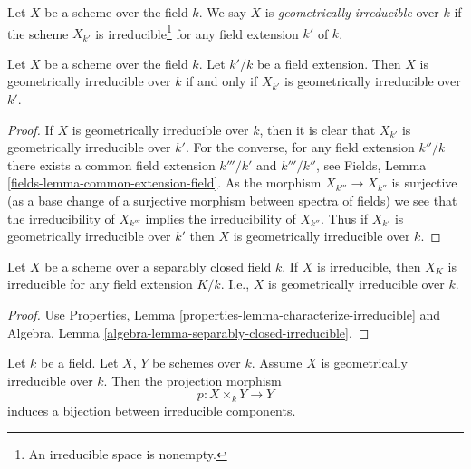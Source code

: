 \begin{definition}
\label{definition-geometrically-irreducible}
Let $X$ be a scheme over the field $k$.
We say $X$ is {\it geometrically irreducible} over $k$ if the scheme
$X_{k'}$ is irreducible\footnote{An irreducible space is nonempty.}
for any field extension $k'$ of $k$.
\end{definition}

\begin{lemma}
\label{lemma-geometrically-irreducible-check-after-extension}
Let $X$ be a scheme over the field $k$.
Let $k'/k$ be a field extension.
Then $X$ is geometrically irreducible over $k$ if and only if
$X_{k'}$ is geometrically irreducible over $k'$.
\end{lemma}

\begin{proof}
If $X$ is geometrically irreducible over $k$, then it is clear that
$X_{k'}$ is geometrically irreducible over $k'$. For the converse,
for any field extension $k''/k$ there exists a common
field extension $k'''/k'$ and $k'''/k''$, see Fields, Lemma
\ref{fields-lemma-common-extension-field}. As the
morphism $X_{k'''} \to X_{k''}$ is surjective (as a base change of
a surjective morphism between spectra of fields) we see that the
irreducibility of $X_{k'''}$ implies the irreducibility of $X_{k''}$.
Thus if $X_{k'}$ is geometrically irreducible over $k'$ then
$X$ is geometrically irreducible over $k$.
\end{proof}

\begin{lemma}
\label{lemma-separably-closed-irreducible}
Let $X$ be a scheme over a separably closed field $k$.
If $X$ is irreducible, then $X_K$ is irreducible for any
field extension $K/k$. I.e., $X$ is geometrically
irreducible over $k$.
\end{lemma}

\begin{proof}
Use Properties, Lemma \ref{properties-lemma-characterize-irreducible}
and Algebra, Lemma \ref{algebra-lemma-separably-closed-irreducible}.
\end{proof}

\begin{lemma}
\label{lemma-bijection-irreducible-components}
Let $k$ be a field.
Let $X$, $Y$ be schemes over $k$.
Assume $X$ is geometrically irreducible over $k$.
Then the projection morphism
$$
p : X \times_k Y \longrightarrow Y
$$
induces a bijection between irreducible components.
\end{lemma}


